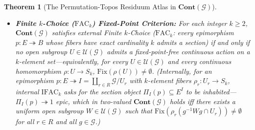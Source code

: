 \documentclass[10pt,twoside,openright]{book}
\theoremstyle{crmplain}
\newtheorem{theorem}{Theorem}[section]
\theoremstyle{crmdef}
\theoremstyle{crmremark}
\begin{document}
\begin{theorem}[The Permutation-Topos Residuum Atlas in $\mathbf{Cont}(\mathcal{G})$]
\begin{itemize}[leftmargin=1.5em]
  \item \textbf{Finite $k$-Choice ($\mathrm{FAC}_k$) Fixed-Point Criterion:} For each integer $k \ge 2$, $\mathbf{Cont}(\mathcal{G})$ satisfies external Finite $k$-Choice ($\mathrm{FAC}_k$: every epimorphism $p : E \twoheadrightarrow B$ whose fibers have exact cardinality $k$ admits a section) if and only if no open subgroup $U \in \mathcal{U}(\mathcal{G})$ admits a fixed-point-free continuous action on a $k$-element set---equivalently, for every $U \in \mathcal{U}(\mathcal{G})$ and every continuous homomorphism $\rho : U \to S_k$, $\mathrm{Fix}(\rho(U)) \neq \emptyset$. (Internally, for an epimorphism $p : E \twoheadrightarrow I = \coprod_{r \in R} \mathcal{G}/U_r$ with $k$-element fibers $\rho_r : U_r \to S_k$, internal $\mathrm{IFAC}_k$ asks for the section object $\Pi_I(p) \subseteq E^I$ to be inhabited---$\Pi_I(p) \twoheadrightarrow 1$ epic, which in two-valued $\mathbf{Cont}(\mathcal{G})$ holds iff there exists a \emph{uniform} open subgroup $W \in \mathcal{U}(\mathcal{G})$ such that $\mathrm{Fix}(\rho_r(g^{-1} W g \cap U_r)) \neq \emptyset$ for all $r \in R$ and all $g \in \mathcal{G}$.)

\end{itemize}

\end{theorem}
\end{document}
